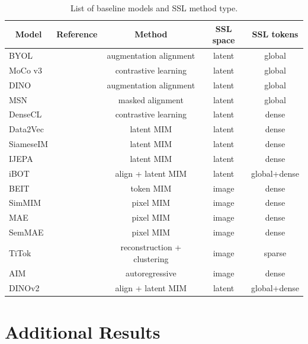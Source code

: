 \begin{table}[hb]
\caption{List of baseline models and SSL method type.}
\label{tab:baselines}
\begin{center}
\begin{tabular}{l l c c c }
\multicolumn{1}{c}{\bf Model} &
\multicolumn{1}{c}{Reference} &
\multicolumn{1}{c}{Method} &
\multicolumn{1}{c}{SSL space} &
\multicolumn{1}{c}{SSL tokens}
\\ \hline 
BYOL & \cite{grill2020bootstrap} & augmentation alignment  &  latent & global \\
MoCo v3 & \cite{chen2021empirical} & contrastive learning  &  latent & global  \\
DINO & \cite{caron2021emerging} & augmentation alignment   &  latent & global \\
MSN  & \cite{assran2022masked}  & masked alignment  &  latent & global  \\
DenseCL & \cite{wang2021dense} & contrastive learning &  latent & dense \\
Data2Vec & \cite{baevski2022data2vec}  & latent MIM   & latent  & dense \\
SiameseIM & \cite{tao2023siamese}  &  latent MIM  & latent  & dense   \\
IJEPA & \cite{assran2023self}  &  latent MIM & latent  & dense   \\
iBOT & \cite{zhou2021ibot}  &  align + latent MIM  & latent  & global+dense  \\
BEIT & \cite{bao2021beit}  & token MIM  &  image  & dense \\
SimMIM  & \cite{xie2022simmim} & pixel MIM  & image  & dense  \\
MAE  & \cite{he2022masked}  & pixel MIM  &  image  & dense  \\
SemMAE  & \cite{li2022semmae}  & pixel MIM  &  image  & dense \\
TiTok  & \cite{yu2024image}  & reconstruction + clustering  &  image  & sparse  \\
AIM      & \cite{el2024scalable}  & autoregressive  & image & dense \\
DINOv2      & \cite{oquab2023dinov2}  & align + latent MIM   & latent & global+dense
\end{tabular}
\end{center}
\end{table}


\section{Additional Results}\label{app:results}


